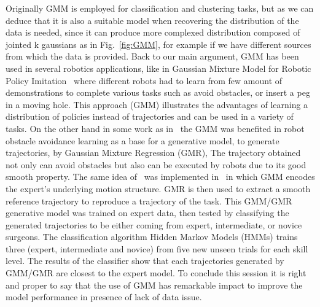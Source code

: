 \vspace{10pt} 
Originally GMM is employed for classification and clustering tasks, but as we can deduce that it is also a suitable model when recovering the distribution of the data is needed, since it can produce more complexed distribution composed of jointed k gaussians as in Fig.~\ref{fig:GMM}, for example if we have different sources from which the data is provided. Back to our main argument, GMM has been used in several robotics applications, like in Gaussian Mixture Model for Robotic Policy Imitation~\cite{pignat2019bayesian} where different robots had to learn from few amount of demonstrations to complete various tasks such as avoid obstacles, or insert a peg in a moving hole. This approach (GMM) illustrates the advantages of learning a distribution of policies instead of trajectories and can be used in a variety of tasks. On the other hand in some work as in~\cite{zhang2016robot} the GMM was benefited in robot obstacle avoidance learning as a base for a generative model, to generate trajectories, by Gaussian Mixture Regression (GMR), The trajectory obtained not only can avoid obstacles but also can be executed by robots due to its good smooth property. The same idea of~\cite{zhang2016robot} was implemented in~\cite{reiley2010motion} in which GMM encodes the expert’s underlying motion structure. GMR is then used to extract a smooth reference trajectory to reproduce a trajectory of the task. This GMM/GMR generative model was trained on expert data, then tested by classifying the generated trajectories  to be either coming from expert, intermediate, or novice surgeons. The classification algorithm Hidden Markov Models (HMMs) trains three (expert, intermediate and novice) from five new unseen trials for each skill level. The results of the classifier show that each trajectories generated by GMM/GMR are closest to the expert model. To conclude this session it is right and proper to say that the use of GMM has remarkable impact to improve the model performance in presence of lack of data issue.


\clearpage{\pagestyle{empty}\cleardoublepage}
